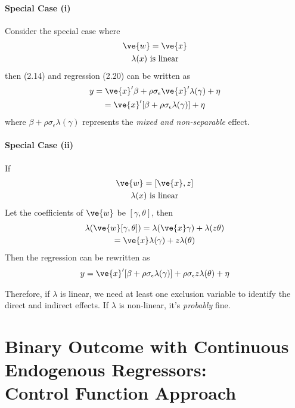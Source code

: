 \documentclass[11pt]{article}
\begin{document}
			\paragraph{Special Case (i)} Consider the special case where
			\begin{gather}
				\ve{w} = \ve{x} \\
				\lambda(x) \tx{ is linear}
			\end{gather}
			then (2.14) and regression (2.20) can be written as 
			\begin{gather}
				y = \ve{x}' \beta + \rho \sigma_\epsilon \ve{x}' \lambda(\gamma) + \eta \\
				= \ve{x}' [\beta + \rho \sigma_\epsilon \lambda(\gamma)] + \eta
			\end{gather}
			where $\beta + \rho \sigma_\epsilon \lambda(\gamma)$ represents the \emph{mixed and non-separable} effect. \\
			\paragraph{Special Case (ii)} If
			\begin{gather}
				\ve{w} = [\ve{x}, z] \\
				\lambda(x) \tx{ is linear} \\
			\end{gather}
			Let the coefficients of $\ve{w}$ be $[\gamma, \theta]$, then
			\begin{gather}
				\lambda(\ve{w}[\gamma, \theta]) = \lambda(\ve{x} \gamma) + \lambda(z \theta) \\
				= \ve{x} \lambda(\gamma) + z \lambda(\theta)
			\end{gather}
			Then the regression can be rewritten as
			\begin{gather}
				y = \ve{x}' [\beta + \rho \sigma_\epsilon \lambda(\gamma)] + \rho \sigma_\epsilon z \lambda(\theta) + \eta
			\end{gather}
			\begin{remark}
				Therefore, if $\lambda$ is linear, we need at least one exclusion variable to identify the direct and indirect effects. If $\lambda$ is non-linear, it's \emph{probably} fine.
			\end{remark}
			
	\section{Binary Outcome with Continuous Endogenous Regressors:\\Control Function Approach}
\end{document}
